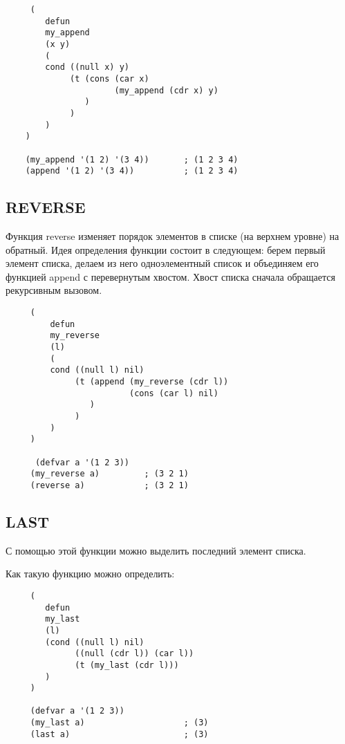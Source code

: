 \begin{lstlisting}
     (
        defun
        my_append
        (x y)
        (
        cond ((null x) y)
             (t (cons (car x)
                      (my_append (cdr x) y)
                )
             )
        )
    )

    (my_append '(1 2) '(3 4))       ; (1 2 3 4)
    (append '(1 2) '(3 4))          ; (1 2 3 4)
\end{lstlisting}

\subsection{REVERSE}

Функция reverse изменяет порядок элементов в списке (на верхнем уровне) на обратный. Идея определения функции состоит в следующем: берем первый элемент списка, делаем из него одноэлементный список и объединяем его функцией append с перевернутым хвостом. Хвост списка сначала обращается рекурсивным вызовом.

\begin{lstlisting}
     (
         defun
         my_reverse
         (l)
         (
         cond ((null l) nil)
              (t (append (my_reverse (cdr l))
                         (cons (car l) nil)
                 )
              )
         )
     )

      (defvar a '(1 2 3))
     (my_reverse a)         ; (3 2 1)
     (reverse a)            ; (3 2 1)
\end{lstlisting}


\subsection{LAST}

С помощью этой функции можно выделить последний элемент списка.

Как такую функцию можно определить:
\begin{lstlisting}
     (
        defun
        my_last
        (l)
        (cond ((null l) nil)
              ((null (cdr l)) (car l))
              (t (my_last (cdr l)))
        )
     )

     (defvar a '(1 2 3))
     (my_last a)                    ; (3)
     (last a)                       ; (3)
\end{lstlisting}



